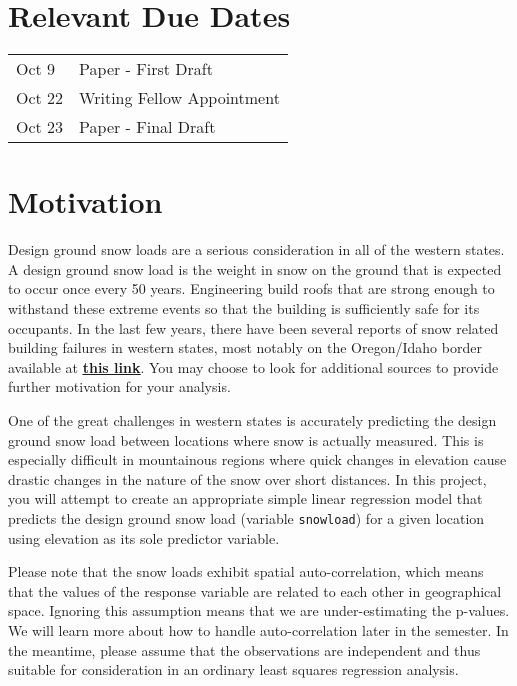 \documentclass[12pt]{notes}
\begin{document}

\section*{Relevant Due Dates}

\begin{center}
\renewcommand{\arraystretch}{1.5}
\begin{tabular}{|l|l|}
\hline
Oct 9 & Paper - First Draft \\
Oct 22 & Writing Fellow Appointment \\
Oct 23 & Paper - Final Draft \\ 
\hline
\end{tabular}
\end{center}

\section*{Motivation}

Design ground snow loads are a serious consideration in all of the western states. A design ground snow load is the weight in snow on the ground that is expected to occur once every 50 years. Engineering build roofs that are strong enough to withstand these extreme events so that the building is sufficiently safe for its occupants. In the last few years, there have been several reports of snow related building failures in western states, most notably on the Oregon/Idaho border available at  \href{https://www.washingtonpost.com/news/morning-mix/wp/2017/01/26/a-lot-of-scared-people-relentless-snow-collapses-hundreds-of-roofs-in-idaho-devastates-rural-county/}{\underline{\textbf{this link}}}. You may choose to look for additional sources to provide further motivation for your analysis. 

One of the great challenges in western states is accurately predicting the design ground snow load between locations where snow is actually measured. This is especially difficult in mountainous regions where quick changes in elevation cause drastic changes in the nature of the snow over short distances. In this project, you will attempt to create an appropriate simple linear regression model that predicts the design ground snow load (variable \texttt{snowload}) for a given location using elevation as its sole predictor variable. 

Please note that the snow loads exhibit spatial auto-correlation, which means that the values of the response variable are related to each other in geographical space. Ignoring this assumption means that we are under-estimating the p-values. We will learn more about how to handle auto-correlation later in the semester. In the meantime, please assume that the observations are independent and thus suitable for consideration in an ordinary least squares regression analysis. 
\end{document}
